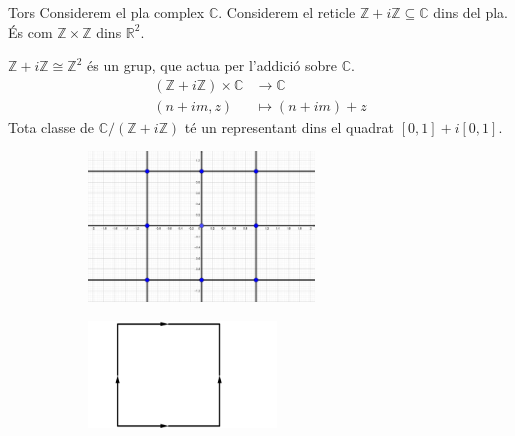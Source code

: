 \documentclass{beamer}
\theoremstyle{definition}
\begin{document}
\begin{frame}{Tors}
Considerem el pla complex $\mathbb{C}$. Considerem el reticle $\mathbb{Z}+i\mathbb{Z}\subseteq\mathbb{C}$ dins del pla. \'{E}s com $\mathbb{Z}\times\mathbb{Z}$ dins $\mathbb{R}^2$.
\pause

$\mathbb{Z}+i\mathbb{Z}\cong\mathbb{Z}^2$ \'{e}s un grup, que actua per l'addici\'{o} sobre $\mathbb{C}$.
\begin{align*}
(\mathbb{Z}+i\mathbb{Z})\times\mathbb{C}&\longrightarrow\mathbb{C}\\
(n+im,z)&\longmapsto(n+im)+z
\end{align*}
\pause
Tota classe de $\mathbb{C}/(\mathbb{Z}+i\mathbb{Z})$ t\'{e} un representant dins el quadrat $[0,1]+i[0,1]$.
\pause
\begin{figure}[ht!]
\begin{center}
\begin{subfigure}{}
\includegraphics[width=6cm]{Reticlesobri.png} 
\end{subfigure}
\begin{subfigure}{}
\includegraphics[width=5cm]{Quadratsobri.png} 
\end{subfigure}
\end{center}
\end{figure}
\end{frame}
\end{document}
